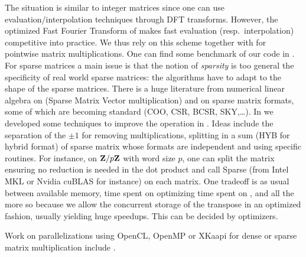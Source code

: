 %
%
The situation is similar to integer matrices since one can use
evaluation/interpolation techniques through DFT transforms. However, the
optimized Fast Fourier Transform of \cite{Harvey:2014}  makes fast evaluation
(resp.\ interpolation) competitive into practice. We thus rely on this scheme
together with \fgemm for pointwise matrix multiplications. One can find some
benchmark of our code in \cite{GioLeb14}.
%
%
For sparse matrices a main issue is that the notion of \emph{sparsity}
is too general \vs the specificity of real world sparse matrices: the
algorithms have to adapt to the shape of the sparse matrices.
%
There is a huge literature from numerical linear algebra  on \spmv (Sparse
Matrix Vector multiplication) and on sparse matrix formats, some of which are
becoming standard (COO, CSR, BCSR, SKY,\ldots).  In \cite{Boyer:2010:spmv} we
developed some techniques to improve the \spmv operation in \linbox. Ideas
include the separation of the $\pm 1$ for removing multiplications, splitting
in a sum (HYB for hybrid format) of sparse matrix  whose formats are
independent and using specific routines. For instance, on $\mathbf{Z}{/ p\mathbf{Z}}$ with
word size $p$, one can split the matrix ensuring no reduction is needed  in the
dot product and call Sparse \blas (from Intel \textsf{MKL} or Nvidia
\textsf{cuBLAS} for instance) on each matrix. One tradeoff is as usual between
available memory, time spent on optimizing \vs time spent on \apply, and all
the more so because we allow the concurrent storage of the transpose in an
optimized fashion, usually yielding huge speedups. This can be decided by
\adhoc optimizers.
%
\par
Work on parallelizations using \textsf{OpenCL}, \textsf{OpenMP} or
\textsf{XKaapi} for dense or sparse matrix multiplication include
\cite{Boyer:2010:spmv,WST12,DGPZ14}.

\begin{comment} %
\paragraph{}
These state-of-the-art algorithms, often interdependent, need to be selected
by the \mul solution, possibly using a Method/Helper parameter. The
Controller/Module model works particularly well here: cascading, switch
methods, algorithms selection is made easy. Besides, the choosing of a
particular algorithms or base case is never settled in advance: the library has
to be tuned wrt. available libraries, local performance of these libraries.
\end{comment}

